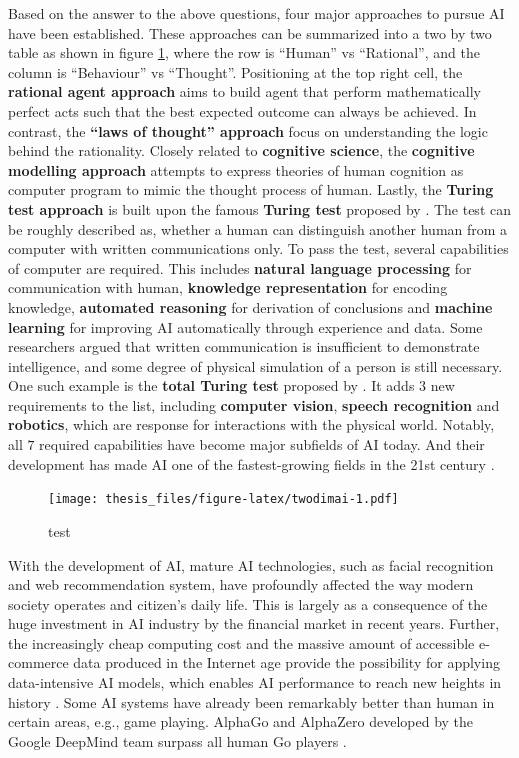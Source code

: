 \documentclass{monashthesis}
\begin{document}
Based on the answer to the above questions, four major approaches to pursue AI have been established. These approaches can be summarized into a two by two table as shown in figure \ref{fig:twodimai}, where the row is ``Human'' vs ``Rational'', and the column is ``Behaviour'' vs ``Thought''. Positioning at the top right cell, the \textbf{rational agent approach} aims to build agent that perform mathematically perfect acts such that the best expected outcome can always be achieved. In contrast, the \textbf{``laws of thought'' approach} focus on understanding the logic behind the rationality. Closely related to \textbf{cognitive science}, the \textbf{cognitive modelling approach} attempts to express theories of human cognition as computer program to mimic the thought process of human. Lastly, the \textbf{Turing test approach} is built upon the famous \textbf{Turing test} proposed by \textcite{turing_computing_1950}. The test can be roughly described as, whether a human can distinguish another human from a computer with written communications only. To pass the test, several capabilities of computer are required. This includes \textbf{natural language processing} for communication with human, \textbf{knowledge representation} for encoding knowledge, \textbf{automated reasoning} for derivation of conclusions and \textbf{machine learning} for improving AI automatically through experience and data. Some researchers argued that written communication is insufficient to demonstrate intelligence, and some degree of physical simulation of a person is still necessary. One such example is the \textbf{total Turing test} proposed by \textcite{harnad_other_1991}. It adds \(3\) new requirements to the list, including \textbf{computer vision}, \textbf{speech recognition} and \textbf{robotics}, which are response for interactions with the physical world. Notably, all \(7\) required capabilities have become major subfields of AI today. And their development has made AI one of the fastest-growing fields in the 21st century \autocite{russell_artificial_2002}.

\begin{figure}
\centering
\texttt{[image: thesis\_files/figure-latex/twodimai-1.pdf]}
\caption{\label{fig:twodimai}test}
\end{figure}

With the development of AI, mature AI technologies, such as facial recognition and web recommendation system, have profoundly affected the way modern society operates and citizen's daily life. This is largely as a consequence of the huge investment in AI industry by the financial market in recent years. Further, the increasingly cheap computing cost and the massive amount of accessible e-commerce data produced in the Internet age provide the possibility for applying data-intensive AI models, which enables AI performance to reach new heights in history \autocite{jordan_machine_2015}. Some AI systems have already been remarkably better than human in certain areas, e.g., game playing. AlphaGo and AlphaZero developed by the Google DeepMind team surpass all human Go players \autocite{silver_general_2018}.
\end{document}
